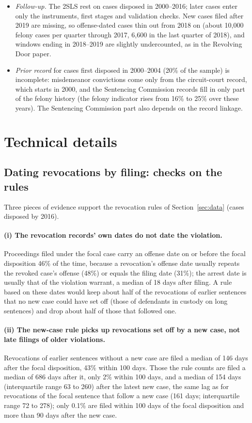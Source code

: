 \documentclass[11pt]{article}
\begin{document}
\begin{itemize}
  \item \emph{Follow-up.} The 2SLS rest on cases disposed in 2000--2016; later cases enter only the instruments, first stages and validation checks. New cases filed after 2019 are missing, so offense-dated cases thin out from 2018 on (about 10,000 felony cases per quarter through 2017, 6,600 in the last quarter of 2018), and windows ending in 2018--2019 are slightly undercounted, as in the Revolving Door paper.
  \item \emph{Prior record} for cases first disposed in 2000--2004 (20\% of the sample) is incomplete: misdemeanor convictions come only from the circuit-court record, which starts in 2000, and the Sentencing Commission records fill in only part of the felony history (the felony indicator rises from 16\% to 25\% over these years). The Sentencing Commission part also depends on the record linkage.
\end{itemize}

\clearpage
\appendix
\section{Technical details}\label{sec:tech}

\subsection{Dating revocations by filing: checks on the rules}\label{sec:dating_details}

Three pieces of evidence support the revocation rules of Section~\ref{sec:data} (cases disposed by 2016).

\paragraph{(i) The revocation records' own dates do not date the violation.} Proceedings filed under the focal case carry an offense date on or before the focal disposition 46\% of the time, because a revocation's offense date usually repeats the revoked case's offense (48\%) or equals the filing date (31\%); the arrest date is usually that of the violation warrant, a median of 18 days after filing. A rule based on these dates would keep about half of the revocations of earlier sentences that no new case could have set off (those of defendants in custody on long sentences) and drop about half of those that followed one.

\paragraph{(ii) The new-case rule picks up revocations set off by a new case, not late filings of older violations.} Revocations of earlier sentences without a new case are filed a median of 146 days after the focal disposition, 43\% within 100 days. Those the rule counts are filed a median of 686 days after it, only 2\% within 100 days, and a median of 154 days (interquartile range 63 to 260) after the latest new case, the same lag as for revocations of the focal sentence that follow a new case (161 days; interquartile range 72 to 278); only 0.1\% are filed within 100 days of the focal disposition and more than 90 days after the new case.
\end{document}
